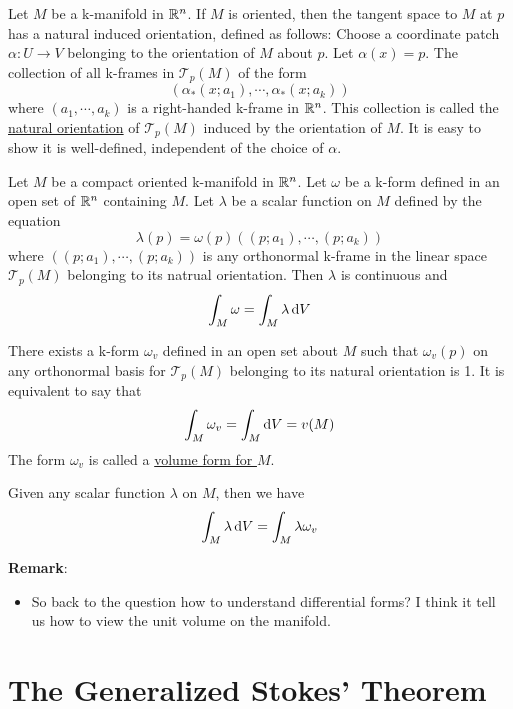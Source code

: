 \begin{definition}
    Let $M$ be a k-manifold in $\mathbb{R}^n$. If $M$ is oriented, then the tangent space to $M$ at $p$ has a natural induced orientation, defined as follows: 
    Choose a coordinate patch $\alpha:U\longrightarrow V$ belonging to the orientation of $M$ about $p$. Let $\alpha(x)=p$. The collection of all k-frames in $\mathcal{T}_p(M)$ of the form $$(\alpha_*(x;a_1),\cdots,\alpha_*(x;a_k))$$
    where $(a_1,\cdots,a_k)$ is a right-handed k-frame in $\mathbb{R}^n$. This collection is called the \underline{natural orientation} of $\mathcal{T}_p(M)$ induced by the orientation of $M$. 
    It is easy to show it is well-defined, independent of the choice of $\alpha$.
\end{definition}

\begin{theorem}
    Let $M$ be a compact oriented k-manifold in $\mathbb{R}^n$. Let $\omega$ be a k-form defined in an open set of $\mathbb{R}^n$ containing $M$. 
    Let $\lambda$ be a scalar function on $M$ defined by the equation $$\lambda(p)=\omega(p)((p;a_1),\cdots,(p;a_k))$$
    where $((p;a_1),\cdots,(p;a_k))$ is any orthonormal k-frame in the linear space $\mathcal{T}_p(M)$ belonging to its natrual orientation. Then $\lambda$ is continuous and $$\int_M\omega=\int_M\lambda \operatorname{d\!} V$$
\end{theorem}

\begin{theorem*}
    There exists a k-form $\omega_v$ defined in an open set about $M$ such that $\omega_v(p)$ on any orthonormal basis for $\mathcal{T}_p(M)$ belonging to its natural orientation is 1. 
    It is equivalent to say that $$\int_M\omega_v=\int_M\operatorname{d\!} V=v(M)$$
    The form $\omega_v$ is called a \underline{volume form for $M$}.
\end{theorem*}

\begin{corollary}
    Given any scalar function $\lambda$ on $M$, then we have $$\int_M\lambda\operatorname{d\!} V =\int_M\lambda\omega_v$$
\end{corollary}

\noindent\textbf{Remark}:
\begin{itemize}
    \item So back to the question how to understand differential forms? I think it tell us how to view the unit volume on the manifold.
\end{itemize}

\section{The Generalized Stokes' Theorem}

